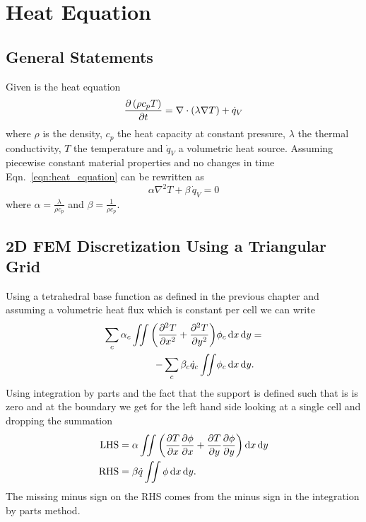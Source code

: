 \chapter{Heat Equation}

\section{General Statements}
Given is the heat equation
\begin{equation}
\label{eqn:heat_equation}
	\pdv{\left(\rho c_p T \right)}{t} = \nabla \cdot \left(\lambda \nabla T \right) + \dot{q}_V
\end{equation}
where $\rho$ is the density, $c_p$ the heat capacity at constant pressure, $\lambda$ the thermal conductivity, $T$ the temperature and $\dot{q}_V$ a volumetric heat source.
Assuming piecewise constant material properties and no changes in time Eqn.~\ref{eqn:heat_equation} can be rewritten as
\begin{equation}
	\alpha \nabla^2 T  + \beta \,\dot{q}_V = 0
\end{equation}
where $\alpha = \frac{\lambda}{\rho c_p}$ and $\beta = \frac{1}{\rho c_p}$.

\section{2D FEM Discretization Using a Triangular Grid}
Using a tetrahedral base function as defined in the previous chapter and assuming a volumetric heat flux which is constant per cell we can write
\begin{align}
	\sum_c \alpha_c \iint \left(\pdv[2]{T}{x} + \pdv[2]{T}{y}\right) &\phi_{c} \mathop{}\!\mathrm{d}{x} \mathop{}\!\mathrm{d}{y} = \\
	-\sum_c \beta_c \dot{q}_c \iint &\phi_{c} \mathop{}\!\mathrm{d}{x} \mathop{}\!\mathrm{d}{y}.
\end{align}
Using integration by parts and the fact that the support is defined such that is is zero and at the boundary we get for the left hand side looking at a single cell and dropping the summation
\begin{align}
\mathrm{LHS} &= \alpha \iint \left(\pdv{T}{x}\pdv{\phi}{x} + \pdv{T}{y}\pdv{\phi}{y} \right) \mathop{}\!\mathrm{d}{x} \mathop{}\!\mathrm{d}{y}\\
\mathrm{RHS} &= \beta \dot{q} \iint \phi \mathop{}\!\mathrm{d}{x} \mathop{}\!\mathrm{d}{y}.
\end{align}
The missing minus sign on the RHS comes from the minus sign in the integration by parts method.

